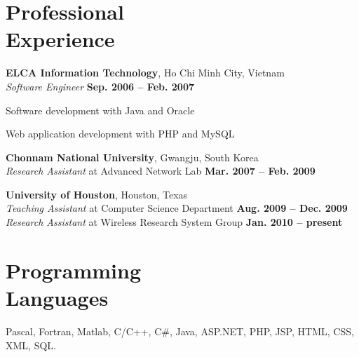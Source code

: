 \documentclass[margin,line]{resume}
\begin{document}
\begin{resume}
    \section{\mysidestyle Professional\\Experience}

    \textbf{ELCA Information Technology}, Ho Chi Minh City, Vietnam \vspace{0mm}\\\vspace{1mm}%
    \textsl{Software Engineer} \hfill \textbf{Sep. 2006 -- Feb. 2007}\\\vspace{-4mm}
    \begin{list2}
        \item Software development with Java and Oracle
        \item Web application development with PHP and MySQL
    \end{list2}\vspace{-1.5mm}

    \textbf{Chonnam National University}, Gwangju, South Korea \vspace{0mm}\\\vspace{1mm}%
    \textsl{Research Assistant} at Advanced Network Lab \hfill \textbf{Mar. 2007 -- Feb. 2009}\vspace{-2.5mm}

    \textbf{University of Houston}, Houston, Texas \vspace{0mm}\\\vspace{0mm}%
    \textsl{Teaching Assistant} at Computer Science Department \hfill \textbf{Aug. 2009 -- Dec. 2009}\\
    \textsl{Research Assistant} at Wireless Research System Group \hfill \textbf{Jan. 2010 -- present}\\\vspace{-5mm}

    \section{\mysidestyle Programming\\Languages}

    Pascal, Fortran, Matlab, C/C++, C\#, Java, ASP.NET, PHP, JSP, HTML, CSS, XML, SQL.\vspace{1.5mm}


\end{resume}
\end{document}
